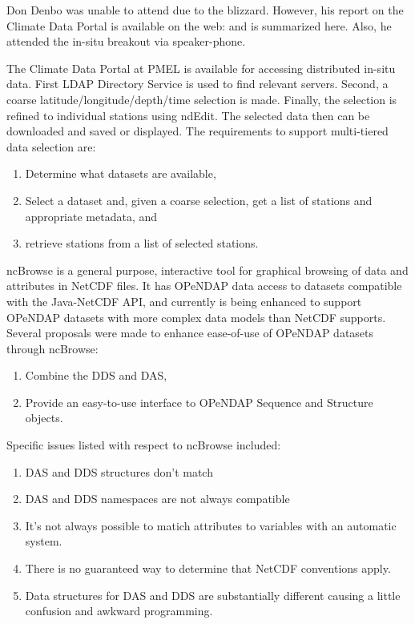 Don Denbo was unable to attend due to the blizzard.  However, his
report on the Climate Data Portal is available on the web:
 and is summarized here.  Also, he attended the in-situ breakout via
speaker-phone. 

The Climate Data Portal at PMEL is available for accessing distributed
in-situ data.  First LDAP Directory Service is used to find relevant
servers.  Second, a coarse latitude/longitude/depth/time selection is
made.  Finally, the selection is refined to individual stations using
ndEdit.  The selected data then can be downloaded and saved or displayed.
The requirements to support multi-tiered data selection are: 

\begin{enumerate}
  \item Determine what datasets are available, 
  \item Select a dataset and, given a coarse selection, get a list of 
       stations and appropriate metadata, and 
  \item retrieve stations from a list of selected stations.  
\end{enumerate} 

ncBrowse is a general
purpose, interactive tool for graphical browsing of data and attributes in 
NetCDF files.  It has OPeNDAP data access to datasets compatible with
the Java-NetCDF API, and currently is being enhanced to support 
OPeNDAP datasets with more complex data models than NetCDF supports.
Several proposals were made to enhance ease-of-use of OPeNDAP datasets
through ncBrowse: 

\begin{enumerate}
  \item Combine the DDS and DAS, 
  \item Provide an easy-to-use interface to OPeNDAP Sequence and 
    Structure objects.  
\end{enumerate} 

Specific issues listed with respect to ncBrowse included:

\begin{enumerate}
  \item DAS and DDS structures don't match
  \item DAS and DDS namespaces are not always compatible
  \item It's not always possible to matich attributes to variables
        with an automatic system.
  \item There is no guaranteed way to determine that NetCDF conventions
        apply.
  \item Data structures for DAS and DDS are substantially different
        causing a little confusion and awkward programming.
\end{enumerate}

